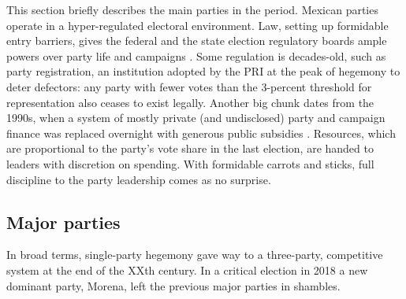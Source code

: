\documentclass[letter,12pt]{article}
\begin{document}
This section briefly describes the main parties in the period. Mexican parties operate in a hyper-regulated electoral environment. Law, setting up formidable entry barriers, gives the federal and the state election regulatory boards ample powers over party life and campaigns \citep{magar.2007ref.2015, estevez.magar.rosas.2008}. Some regulation is decades-old, such as party registration, an institution adopted by the PRI at the peak of hegemony to deter defectors: any party with fewer votes than the 3-percent threshold for representation also ceases to exist legally. Another big chunk dates from the 1990s, when a system of mostly private (and undisclosed) party and campaign finance was replaced overnight with generous public subsidies \citep{poire.Money2005}. Resources, which are proportional to the party's vote share in the last election, are handed to leaders with discretion on spending. With formidable carrots and sticks, full discipline to the party leadership comes as no surprise. 

\subsection{Major parties}

In broad terms, single-party hegemony gave way to a three-party, competitive system at the end of the XXth century. In a critical election in 2018 a new dominant party, Morena, left the previous major parties in shambles.
\end{document}
